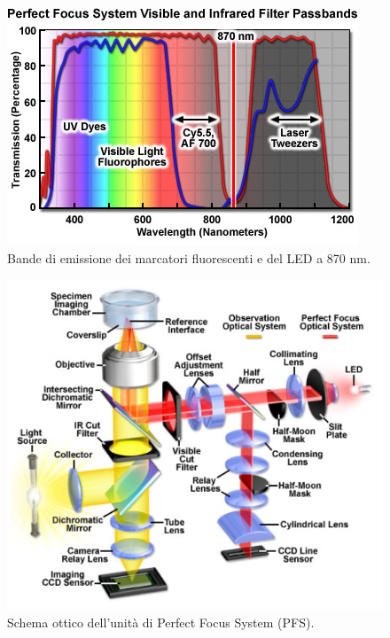 \begin{itemize}
\begin{figure}
 \centering
 \includegraphics[scale=.60]{img/CAP2bande.png}
 \caption{\small{Bande di emissione dei marcatori fluorescenti e del LED a 870 nm.}}
 \label{fig:bande}
\end{figure}

\begin{figure}
 \centering
 \includegraphics[scale=.60]{img/CAP2PFSschema.png}
 \caption{\small{Schema ottico dell'unità di Perfect Focus System (PFS).}}
 \label{fig:PFSschema}
\end{figure}


\end{itemize}
